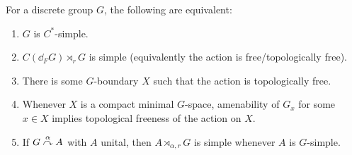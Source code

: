 \begin{theorem}
	For a discrete group $G$, the following are equivalent:
\begin{enumerate}
		\item $G$ is $C^*$-simple.
		\item $C(\dd_F G) \rtimes_r G$ is simple (equivalently the action is free/topologically free).
		\item There is some $G$-boundary $X$ such that the action is topologically free.
		\item Whenever $X$ is a compact minimal $G$-space, amenability of $G_x$ for some $x \in X$ implies topological freeness of the action on $X$.
		\item If $G \stackrel{\alpha}{\curvearrowright} A$ with $A$ unital, then $A \rtimes_{\alpha,r} G$ is simple whenever $A$ is $G$-simple.
	\end{enumerate}
	\label{breulcsimple}
\end{theorem}
